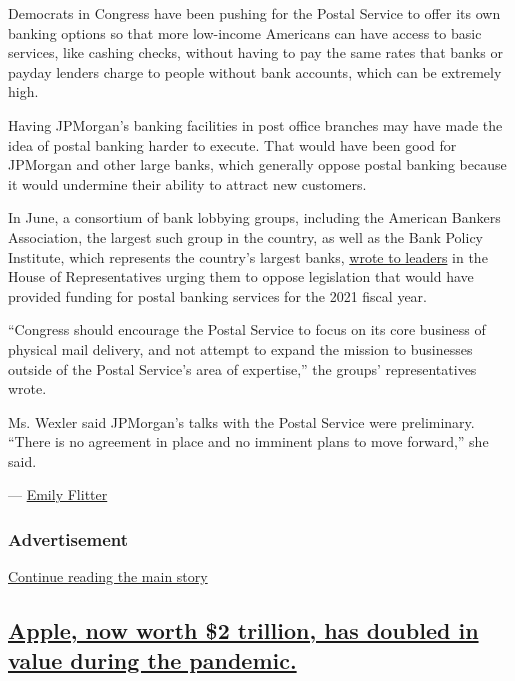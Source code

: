 Democrats in Congress have been pushing for the Postal Service to offer
its own banking options so that more low-income Americans can have
access to basic services, like cashing checks, without having to pay the
same rates that banks or payday lenders charge to people without bank
accounts, which can be extremely high.

Having JPMorgan's banking facilities in post office branches may have
made the idea of postal banking harder to execute. That would have been
good for JPMorgan and other large banks, which generally oppose postal
banking because it would undermine their ability to attract new
customers.

In June, a consortium of bank lobbying groups, including the American
Bankers Association, the largest such group in the country, as well as
the Bank Policy Institute, which represents the country's largest banks,
\href{https://www.aba.com/advocacy/policy-analysis/joint-financial-services-trades-letter-to-the-house-oppose-pascrell-kaptur-postal-banking-amendment}{wrote
to leaders} in the House of Representatives urging them to oppose
legislation that would have provided funding for postal banking services
for the 2021 fiscal year.

``Congress should encourage the Postal Service to focus on its core
business of physical mail delivery, and not attempt to expand the
mission to businesses outside of the Postal Service's area of
expertise,'' the groups' representatives wrote.

Ms. Wexler said JPMorgan's talks with the Postal Service were
preliminary. ``There is no agreement in place and no imminent plans to
move forward,'' she said.

--- \href{https://www.nytimes3xbfgragh.onion/by/emily-flitter}{Emily
Flitter}

\hypertarget{advertisement-1}{%
\subsubsection{Advertisement}\label{advertisement-1}}

\protect\hyperlink{after-dfp-ad-mid2}{Continue reading the main story}

\hypertarget{apple-now-worth-2-trillion-has-doubled-in-value-during-the-pandemic}{%
\subsection{\texorpdfstring{\protect\hyperlink{apple-now-worth-2-trillion-has-doubled-in-value-during-the-pandemic}{Apple,
now worth \$2 trillion, has doubled in value during the
pandemic.}}{Apple, now worth \$2 trillion, has doubled in value during the pandemic.}}\label{apple-now-worth-2-trillion-has-doubled-in-value-during-the-pandemic}}

